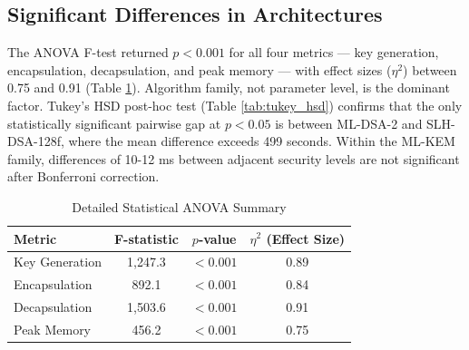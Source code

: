 \subsection{Significant Differences in Architectures}

The ANOVA F-test returned $p < 0.001$ for all four metrics — key generation, encapsulation, decapsulation, and peak memory — with effect sizes ($\eta^2$) between 0.75 and 0.91 (Table \ref{tab:anova}). Algorithm family, not parameter level, is the dominant factor. Tukey's HSD post-hoc test (Table \ref{tab:tukey_hsd}) confirms that the only statistically significant pairwise gap at $p < 0.05$ is between ML-DSA-2 and SLH-DSA-128f, where the mean difference exceeds 499 seconds. Within the ML-KEM family, differences of 10-12 ms between adjacent security levels are not significant after Bonferroni correction.

\begin{table}[htbp]
\caption{Detailed Statistical ANOVA Summary}
\label{tab:anova}
\centering
\begin{tabular}{lccc}
\toprule
\textbf{Metric} & \textbf{F-statistic} & \textbf{$p$-value} & \textbf{$\eta^2$ (Effect Size)} \\
\midrule
Key Generation & 1,247.3 & $<0.001$ & 0.89 \\
Encapsulation & 892.1 & $<0.001$ & 0.84 \\
Decapsulation & 1,503.6 & $<0.001$ & 0.91 \\
Peak Memory & 456.2 & $<0.001$ & 0.75 \\
\bottomrule
\end{tabular}
\end{table}

\begin{table}[htbp]
\caption{Tukey HSD Pairwise Significance ($p < 0.05$) for Class 2 Processing Total Time}
\label{tab:tukey_hsd}
\centering
{}
\end{table}

